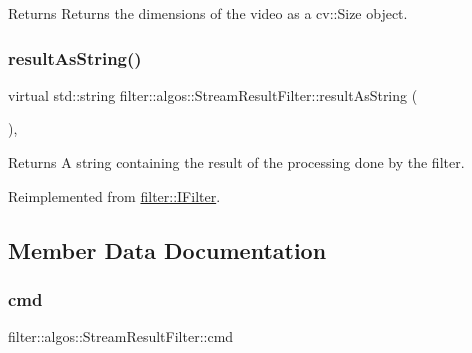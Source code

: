 \begin{DoxyReturn}{Returns}
Returns the dimensions of the video as a cv\+::\+Size object. 
\end{DoxyReturn}
\mbox{\label{classfilter_1_1algos_1_1_stream_result_filter_acdd774d7dc6a7b807d5fc0bfe3343949}} 
\subsubsection{\texorpdfstring{result\+As\+String()}{resultAsString()}}
{\footnotesize\ttfamily virtual std\+::string filter\+::algos\+::\+Stream\+Result\+Filter\+::result\+As\+String (\begin{DoxyParamCaption}{ }\end{DoxyParamCaption})\hspace{0.3cm}{\ttfamily [inline]}, {\ttfamily [virtual]}}

\begin{DoxyReturn}{Returns}
A string containing the result of the processing done by the filter. 
\end{DoxyReturn}


Reimplemented from \hyperlink{classfilter_1_1_i_filter_ab99902b060a6d9edc3452a8c9f85e37e}{filter\+::\+I\+Filter}.



\subsection{Member Data Documentation}
\mbox{\label{classfilter_1_1algos_1_1_stream_result_filter_a4c5d13897dc30f58b87381090f5249b3}} 
\subsubsection{\texorpdfstring{cmd}{cmd}}
{\footnotesize\ttfamily filter\+::algos\+::\+Stream\+Result\+Filter\+::cmd}

